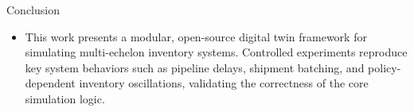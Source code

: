 \documentclass[final]{beamer}
\newlength{\colwidth}
\begin{document}
\begin{frame}[t]
\begin{columns}[t]
\begin{column}{\colwidth}
			\begin{block}{Conclusion}
				
				\begin{itemize}
				\item This work presents a modular, open-source digital twin framework for simulating multi-echelon 
				inventory systems. Controlled experiments reproduce key system behaviors such as pipeline delays, shipment
				batching, and policy-dependent inventory oscillations, validating the correctness of the core simulation
				logic.


\end{itemize}
\end{block}
\end{column}
\end{columns}
\end{frame}
\end{document}
